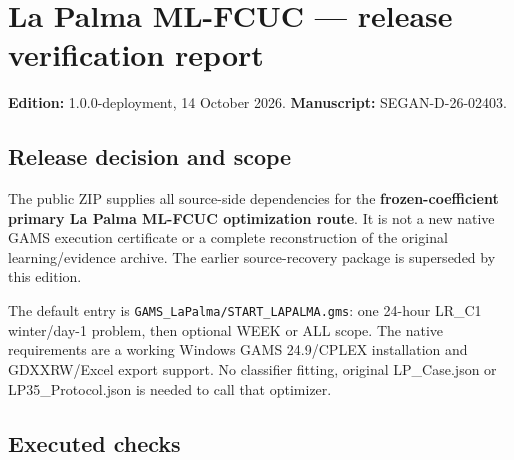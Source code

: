 \documentclass[
  11pt,
  a4paper,
]{article}
\author{}
\date{}
\begin{document}
\section{La Palma ML-FCUC --- release verification
report}\label{la-palma-ml-fcuc-release-verification-report}

\textbf{Edition:} 1.0.0-deployment, 14 October 2026.
\textbf{Manuscript:} SEGAN-D-26-02403.

\subsection{Release decision and
scope}\label{release-decision-and-scope}

The public ZIP supplies all source-side dependencies for the
\textbf{frozen-coefficient primary La Palma ML-FCUC optimization route}.
It is not a new native GAMS execution certificate or a complete
reconstruction of the original learning/evidence archive. The earlier
source-recovery package is superseded by this edition.

The default entry is \texttt{GAMS\_LaPalma/START\_LAPALMA.gms}: one
24-hour LR\_C1 winter/day-1 problem, then optional WEEK or ALL scope.
The native requirements are a working Windows GAMS 24.9/CPLEX
installation and GDXXRW/Excel export support. No classifier fitting,
original LP\_Case.json or LP35\_Protocol.json is needed to call that
optimizer.

\subsection{Executed checks}\label{executed-checks}
\end{document}
